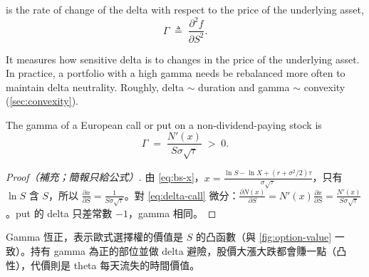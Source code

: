 \begin{definition}
	 is the rate of change of the delta with respect to the price of the underlying asset,
	\[
		\Gamma \;\triangleq\; \frac{\partial^{2}f}{\partial S^{2}} .
	\]
\end{definition}

It measures how sensitive delta is to changes in the price of the underlying asset.
In practice, a portfolio with a high gamma needs be rebalanced more often to maintain delta neutrality.
Roughly, delta $\sim$ duration and gamma $\sim$ convexity (\autoref{sec:convexity}).

\suppstart
{}
\suppend

\begin{proposition}
	The gamma of a European call or put on a non-dividend-paying stock is
	\[
		\Gamma \;=\; \frac{N'(x)}{S\sigma\sqrt{\tau}} \;>\; 0 .
	\]
\end{proposition}

\suppstart
{}

\begin{proof}[Proof（補充；簡報只給公式）]
	由 \eqref{eq:bs-x}，$x=\frac{\ln S-\ln X+(r+\sigma^{2}/2)\tau}{\sigma\sqrt{\tau}}$，只有 $\ln S$ 含 $S$，所以 $\frac{\partial x}{\partial S}=\frac{1}{S\sigma\sqrt{\tau}}$。對 \eqref{eq:delta-call} 微分：$\frac{\partial N(x)}{\partial S}=N'(x)\frac{\partial x}{\partial S}=\frac{N'(x)}{S\sigma\sqrt{\tau}}$。put 的 delta 只差常數 $-1$，gamma 相同。
\end{proof}

\begin{remark}
	Gamma 恆正，表示歐式選擇權的價值是 $S$ 的凸函數（與 \autoref{fig:option-value} 一致）。持有 gamma 為正的部位並做 delta 避險，股價大漲大跌都會賺一點（凸性），代價則是 theta 每天流失的時間價值。
\end{remark}
\suppend


